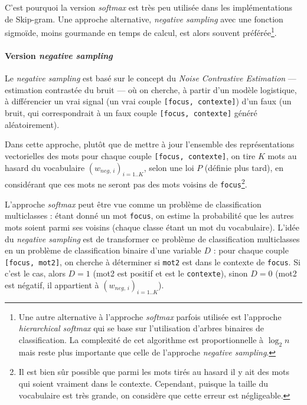 \documentclass[11pt,french,french]{article}
\let\rmarkdownfootnote\footnote%
\def\footnote{\protect\rmarkdownfootnote}
\begin{document}
C'est pourquoi la version \emph{softmax} est très peu utilisée dans les
implémentations de Skip-gram. Une approche alternative, \emph{negative
sampling} avec une fonction sigmoïde, moins gourmande en temps de
calcul, est alors souvent préférée\footnote{Une autre alternative à
  l'approche \emph{softmax} parfois utilisée est l'approche
  \emph{hierarchical softmax} qui se base sur l'utilisation d'arbres
  binaires de classification. La complexité de cet algorithme est
  proportionnelle à \(\log_2n\) mais reste plus importante que celle de
  l'approche \emph{negative sampling}.}.

\paragraph{\texorpdfstring{Version \emph{negative
sampling}}{Version negative sampling}}\label{subsec:negsampling}

Le \emph{negative sampling} est basé sur le concept du \emph{Noise
Contrastive Estimation} --- estimation contrastée du bruit --- où on
cherche, à partir d'un modèle logistique, à différencier un vrai signal
(un vrai couple \texttt{{[}focus,\ contexte{]}}) d'un faux (un bruit,
qui correspondrait à un faux couple \texttt{{[}focus,\ contexte{]}}
généré aléatoirement).

Dans cette approche, plutôt que de mettre à jour l'ensemble des
représentations vectorielles des mots pour chaque couple
\texttt{{[}focus,\ contexte{]}}, on tire \(K\) mots au hasard du
vocabulaire \((w_{neg,\,i})_{i=1..K}\), selon une loi \(P\) (définie
plus tard), en considérant que ces mots ne seront pas des mots voisins
de \texttt{focus}\footnote{Il est bien sûr possible que parmi les mots
  tirés au hasard il y ait des mots qui soient vraiment dans le
  contexte. Cependant, puisque la taille du vocabulaire est très grande,
  on considère que cette erreur est négligeable.}.

L'approche \emph{softmax} peut être vue comme un problème de
classification multiclasses : étant donné un mot \texttt{focus}, on
estime la probabilité que les autres mots soient parmi ses voisins
(chaque classe étant un mot du vocabulaire). L'idée du \emph{negative
sampling} est de transformer ce problème de classification multiclasses
en un problème de classification binaire d'une variable \(D\) : pour
chaque couple \texttt{{[}focus,\ mot2{]}}, on cherche à déterminer si
\texttt{mot2} est dans le contexte de \texttt{focus}. Si c'est le cas,
alors \(D=1\) (mot2 est positif et est le \texttt{contexte}), sinon
\(D=0\) (mot2 est négatif, il appartient à \((w_{neg,\,i})_{i=1..K}\)).
\end{document}
